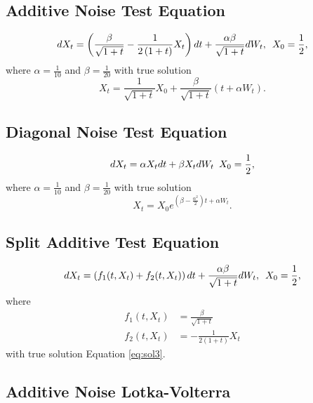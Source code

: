 \documentclass{article}
\begin{document}
\subsection{Additive Noise Test Equation}

\begin{equation}
dX_{t}=\left(\frac{\beta}{\sqrt{1+t}}-\frac{1}{2\left(1+t\right)}X_{t}\right)dt+\frac{\alpha\beta}{\sqrt{1+t}}dW_{t},\thinspace\thinspace\thinspace X_{0}=\frac{1}{2},\label{eq:ex3}
\end{equation}
where $\alpha=\frac{1}{10}$ and $\beta=\frac{1}{20}$ with true
solution
\begin{equation}
X_{t}=\frac{1}{\sqrt{1+t}}X_{0}+\frac{\beta}{\sqrt{1+t}}\left(t+\alpha W_{t}\right).\label{eq:sol3}
\end{equation}

\subsection{Diagonal Noise Test Equation}

\begin{equation}
dX_{t}=\alpha X_{t}dt+\beta X_{t}dW_{t}\thinspace\thinspace\thinspace X_{0}=\frac{1}{2},\label{eq:ex1}
\end{equation}
where $\alpha=\frac{1}{10}$ and $\beta=\frac{1}{20}$ with true solution
\begin{equation}
X_{t}=X_{0}e^{\left(\beta-\frac{\alpha^{2}}{2}\right)t+\alpha W_{t}}.\label{eq:sol1}
\end{equation}

\subsection{Split Additive Test Equation}

\begin{equation}
dX_{t}=\left(f_{1}(t,X_{t})+f_{2}(t,X_{t})\right)dt+\frac{\alpha\beta}{\sqrt{1+t}}dW_{t},\thinspace\thinspace\thinspace X_{0}=\frac{1}{2},\label{eq:ex3-1}
\end{equation}
where
\begin{align*}
f_{1}(t,X_{t}) & =\frac{\beta}{\sqrt{1+t}}\\
f_{2}(t,X_{t}) & =-\frac{1}{2\left(1+t\right)}X_{t}
\end{align*}
with true solution Equation \ref{eq:sol3}.

\subsection{Additive Noise Lotka-Volterra}
\end{document}
